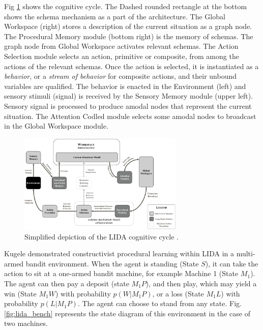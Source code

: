\documentclass[runningheads]{llncs}
\begin{document}
Fig \ref{fig:lida} shows the cognitive cycle. 
The Dashed rounded rectangle at the bottom shows the schema mechanism as a part of the architecture. 
The Global Workspace (right) stores a description of the current situation as a graph node. 
The Procedural Memory module (bottom right) is the memory of schemas. 
The graph node from Global Workspace activates relevant schemas. 
The Action Selection module selects an action, primitive or composite, from among the actions of the relevant schemas. 
Once the action is selected, it is instantiated as a \textit{behavior}, or a \textit{stream of behavior} for composite actions, and their unbound variables are qualified. 
The behavior is enacted in the Environment (left) and sensory stimuli (signal) is received by the Sensory Memory module (upper left).
Sensory signal is processed to produce amodal nodes that represent the current situation. 
The Attention Codled module selects some amodal nodes to broadcast in the Global Workspace module. 

\begin{figure}
	\centering
	\includegraphics[width=0.7\textwidth]{Figure_LIDA.png}
	\caption{Simplified depiction of the LIDA cognitive cycle \cite[Fig. 4]{kugele2025_constructivist}.
	} 
	\label{fig:lida}
\end{figure}


Kugele \cite{kugele2025_constructivist} demonstrated constructivist procedural learning within LIDA in a multi-armed bandit environment.
When the agent is standing (State $S$), it can take the action to sit at a one-armed bandit machine, for example Machine 1 (State $M_1$).
The agent can then pay a deposit (state $M_1P$), and then play, which may yield a win (State $M_1W$) with probability $p(W|M_1P)$, or a loss (State $M_1L$) with probability $p(L|M_1P)$. The agent can choose to stand from any state.
Fig. \ref{fig:lida_bench} represents the state diagram of this environment in the case of two machines. 
\end{document}
